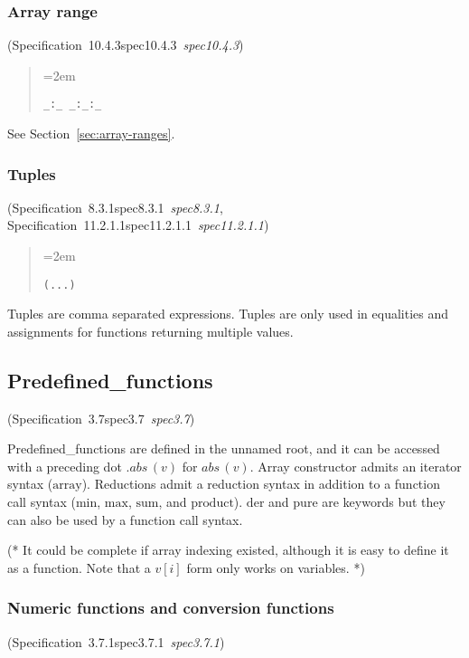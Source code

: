 \documentclass[10pt,b5paper]{article}
\def\specrefx#1#2{Specification~#1\ifx\relax#2\relax{}\else~{\it{}#2}\fi}
\def\specref#1{\specrefx{#1}{\csname spec#1\endcsname}}
\begin{document}
\subsubsection*{Array range}
(\specref{10.4.3}\/)


\begin{quote}
\spaceskip=2em
\begin{verbatim}
_:_ _:_:_
\end{verbatim}
\end{quote}

\noindent See Section~\ref{sec:array-ranges}.

\subsubsection*{Tuples}
(\specref{8.3.1}, \specref{11.2.1.1}\/)

\begin{quote}
\spaceskip=2em
\begin{verbatim}
(...)
\end{verbatim}
\end{quote}

\noindent Tuples are comma separated expressions.  Tuples are only
used in equalities and assignments for functions returning multiple
values.


\subsection{Predefined_functions}
(\specref{3.7}\/)

Predefined_functions are defined in the unnamed root, and it can be
accessed with a preceding dot $.\mathit{abs}\,(v)$ for
$\mathit{abs}\,(v)$.  Array constructor admits an iterator syntax
($\mathrm{array}$).  Reductions admit a reduction syntax in addition
to a function call syntax ($\mathrm{min}$, $\mathrm{max}$,
$\mathrm{sum}$, and $\mathrm{product}$).  $\mathrm{der}$ and
$\mathrm{pure}$ are keywords but they can also be used by a function
call syntax.

(* It could be complete if array indexing existed, although it is easy
to define it as a function.  Note that a $v[i]$ form only works on
variables. *)

\subsubsection*{Numeric functions and conversion functions}
(\specref{3.7.1}\/)
\end{document}
